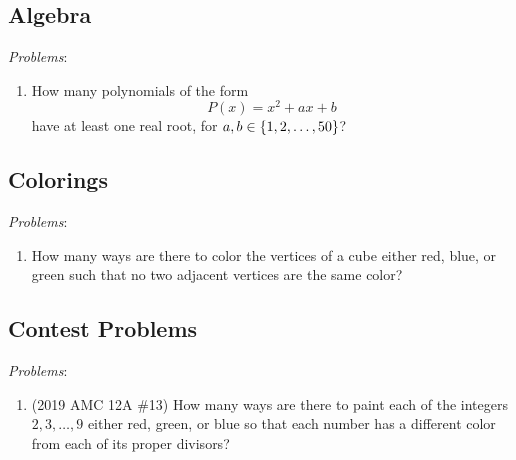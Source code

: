 \subsection{Algebra}

\textit{Problems}: 
\begin{enumerate}
    \item How many polynomials of the form
        \[
            P \left( x \right) = x^2 + ax + b
        \]
        have at least one real root, for \( a, b \in \left\{ 1, 2, \ldots, 50 \right\} \)?
\end{enumerate}

\subsection{Colorings}

\textit{Problems}: 
\begin{enumerate}
    \item How many ways are there to color the vertices of a cube either red,
        blue, or green such that no two adjacent vertices are the same color?
\end{enumerate}

\subsection{Contest Problems}

\textit{Problems}: 
\begin{enumerate}
    \item (2019 AMC 12A \#13) How many ways are there to paint each of the
        integers \( 2,3,\ldots,9 \) either red, green, or blue so that each
        number has a different color from each of its proper divisors?
\end{enumerate}
